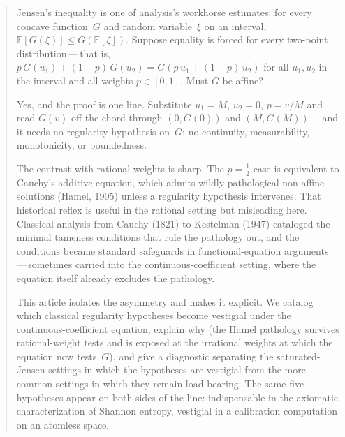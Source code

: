 \documentclass{article}
\theoremstyle{plain}
\theoremstyle{definition}
\newcommand{\E}{\mathbb{E}}
\begin{document}
\author{}

\maketitle

\begin{abstract}
Jensen's inequality is one of analysis's workhorse estimates: for every concave
function~$G$ and random variable~$\xi$ on an interval,
$\E[G(\xi)]\le G(\E[\xi])$. Suppose equality is forced for every
two-point distribution\,---\,that is,
$p\,G(u_1)+(1-p)\,G(u_2)=G(p\,u_1+(1-p)\,u_2)$ for all $u_1,u_2$ in
the interval and all weights $p\in[0,1]$. Must $G$ be affine?

Yes, and the proof is one line. Substitute $u_1=M$, $u_2=0$, $p=v/M$
and read $G(v)$ off the chord through $(0,G(0))$ and
$(M,G(M))$\,---\,and it needs no regularity hypothesis on~$G$: no
continuity, measurability, monotonicity, or boundedness.

The contrast with rational weights is sharp. The $p=\tfrac12$ case is
equivalent to Cauchy's additive equation, which admits wildly
pathological non-affine solutions (Hamel, 1905) unless a regularity
hypothesis intervenes. That historical reflex is useful in the rational setting but misleading here. Classical analysis from Cauchy (1821) to
Kestelman (1947) cataloged the minimal tameness conditions that rule
the pathology out, and the conditions became standard safeguards in
functional-equation arguments\,---\,sometimes carried into the continuous-coefficient setting, where the equation itself already excludes the pathology.

This article isolates the asymmetry and makes it explicit. We catalog which
classical regularity hypotheses become vestigial under the
continuous-coefficient equation, explain why (the Hamel pathology
survives rational-weight tests and is exposed at the irrational weights at which the
equation now tests~$G$), and give a diagnostic separating the saturated-Jensen
settings in which the hypotheses are vestigial from the more common
settings in which they remain load-bearing. The same five hypotheses
appear on both sides of the line: indispensable in the axiomatic
characterization of Shannon entropy, vestigial in a calibration
computation on an atomless space.
\end{abstract}
\end{document}

